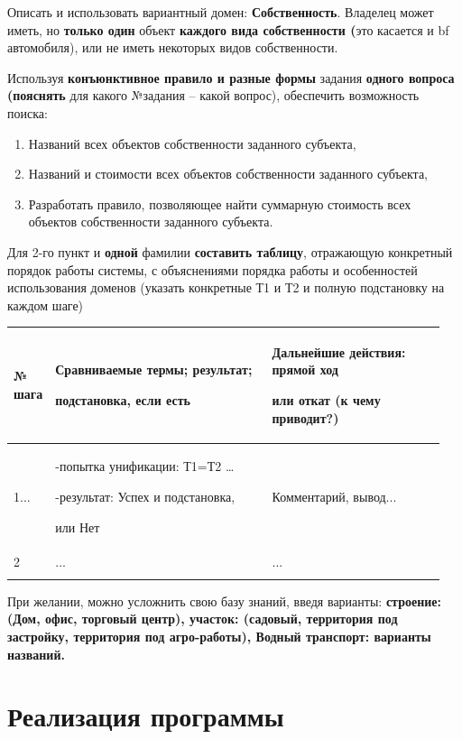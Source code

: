 \documentclass[a4paper,12pt]{article}
\begin{document}
	Описать и использовать вариантный домен: {\bf Собственность}. Владелец может иметь, но {\bf только один} объект {\bf каждого вида собственности (}это касается и {bf автомобиля)}, или не иметь некоторых видов собственности. 
	
	Используя {\bf конъюнктивное правило и 
	разные формы} задания {\bf одного вопроса (пояснять} для какого №задания – какой вопрос), 
	обеспечить возможность поиска:
	
	\begin{enumerate}
		\item Названий всех объектов собственности заданного субъекта,
		\item Названий и стоимости всех объектов собственности заданного субъекта,
		\item Разработать правило, позволяющее найти суммарную стоимость всех объектов собственности заданного субъекта.
	\end{enumerate}

	Для 2-го пункт и {\bf одной} фамилии {\bf составить таблицу}, отражающую конкретный порядок работы системы, с объяснениями порядка работы и особенностей использования доменов (указать конкретные Т1 и Т2 и полную подстановку на каждом шаге)
	
	\begin{center}
		\begin{longtable}[h!]{|p{0.05\linewidth}|p{0.5\linewidth}|p{ 0.4\linewidth}|}
			\hline
			{№ шага} & {Сравниваемые термы; результат; 
				
				подстановка, если есть} & {Дальнейшие действия: прямой ход 
				
				или откат (к чему приводит?)}\\
			\hline
			{1...} & {-попытка унификации: Т1=Т2 …
				
				-результат: Успех и подстановка,
				
				или Нет
			} & {Комментарий, вывод...}\\
			\hline
			{2} & {...} & {...}\\
			\hline
			\label{m1}
		\end{longtable}
	\end{center}
	
	При желании, можно усложнить свою базу знаний, введя варианты: {\bf строение: (Дом, офис, торговый центр), участок: (садовый, территория под застройку, территория под агро-работы), Водный транспорт: варианты названий.}
	
	\newpage
	
	\section*{Реализация программы}
	
\end{document}
